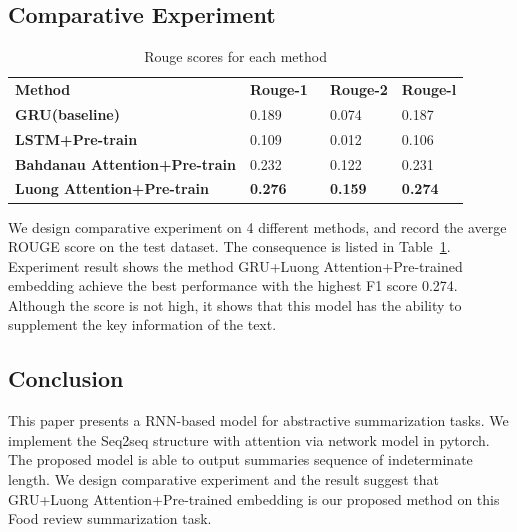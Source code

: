 \documentclass[conference]{IEEEtran}
\begin{document}
\subsection{Comparative Experiment}
\begin{table}
\centering
\caption{\label{tab:Results}Rouge scores for each method}
\begin{tabular}{llll} 
\toprule
\textbf{Method}                              & \textbf{Rouge-1~} & \textbf{Rouge-2} & \textbf{Rouge-l}  \\
\textbf{GRU(baseline)}                       & 0.189             & 0.074            & 0.187             \\
\textbf{LSTM+Pre-train}          & 0.109             & 0.012            & 0.106             \\
\textbf{Bahdanau Attention+Pre-train} & 0.232             & 0.122            & 0.231             \\
\textbf{Luong Attention+Pre-train}    & \textbf{0.276}    & \textbf{0.159}   & \textbf{0.274}    \\
\bottomrule
\end{tabular}
\end{table}
We design comparative experiment on 4 different methods, and record the averge ROUGE score on the test dataset. The consequence is listed in Table~\ref{tab:Results}. Experiment result shows the method GRU+Luong Attention+Pre-trained embedding achieve the best performance with the highest F1 score 0.274. Although the score is not high, it shows that this model has the ability to supplement the key information of the text. 
\subsection{Conclusion}
This paper presents a RNN-based model for abstractive summarization tasks. We implement the Seq2seq structure with attention via network model in pytorch. The proposed model is able to output summaries sequence of indeterminate length. We design comparative experiment and the result suggest that GRU+Luong Attention+Pre-trained embedding is our proposed method on this Food review summarization task. 



\end{document}
